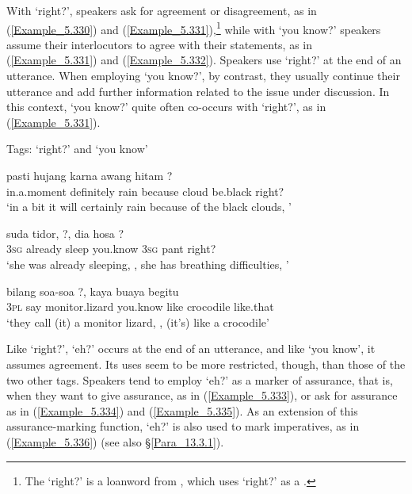 With  ‘right?’, speakers ask for agreement or disagreement, as in (\ref{Example_5.330}) and (\ref{Example_5.331}),\footnote{The   ‘right?’ is a loanword from , which uses  ‘right?’ as a .} while with  ‘you know?’ speakers assume their interlocutors to agree with their statements, as in (\ref{Example_5.331}) and (\ref{Example_5.332}). Speakers use  ‘right?’ at the end of an utterance. When employing  ‘you know?’, by contrast, they usually continue their utterance and add further information related to the issue under discussion. In this context,  ‘you know?’ quite often co-occurs with  ‘right?’, as in (\ref{Example_5.331}).


\begin{styleExampleTitle}
Tags:  ‘right?’ and  ‘you know’
\end{styleExampleTitle}

\ea
\label{Example_5.330}
 {pasti} {hujang} {karna} {awang} {hitam} {?}\\ %
 in.a.moment  definitely  rain  because  cloud  be.black  right?\\
\glt 
‘in a bit it will certainly rain because of the black clouds, ’ \textstyleExampleSource{[080919-005-Cv.0016]}
\z

\ea
\label{Example_5.331}
 {suda} {tidor,} {?,} {dia} {hosa} {?}\\ %
 \textsc{3sg}  already  sleep  you.know  \textsc{3sg}  pant  right?\\
\glt 
‘she was already sleeping, , she has breathing difficulties, ’ \textstyleExampleSource{[080916-001-CvNP.0005]}
\z

\ea
\label{Example_5.332}
 {bilang} {soa-soa} {?,} {kaya} {buaya} {begitu}\\ %
 \textsc{3pl}  say  monitor.lizard  you.know  like  crocodile  like.that\\
\glt 
‘they call (it) a monitor lizard, , (it’s) like a crocodile’ \textstyleExampleSource{[080922-009-CvNP.0053]}
\z


Like  ‘right?’,  ‘eh?’ occurs at the end of an utterance, and like  ‘you know’, it assumes agreement. Its uses seem to be more restricted, though, than those of the two other tags. Speakers tend to employ  ‘eh?’ as a marker of assurance, that is, when they want to give assurance, as in (\ref{Example_5.333}), or ask for assurance as in (\ref{Example_5.334}) and (\ref{Example_5.335}). As an extension of this assurance-marking function,  ‘eh?’ is also used to mark imperatives, as in (\ref{Example_5.336}) (see also §\ref{Para_13.3.1}).


